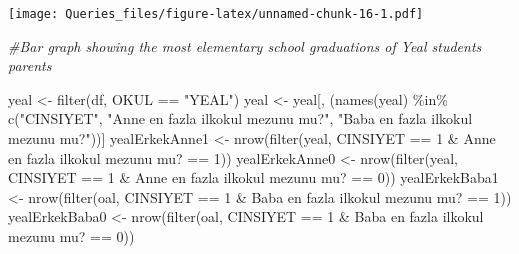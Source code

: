 \documentclass[
]{article}
\newenvironment{Shaded}{\begin{snugshade}}{\end{snugshade}}
\newcommand{\AttributeTok}[1]{\textcolor[rgb]{0.77,0.63,0.00}{#1}}
\newcommand{\CommentTok}[1]{\textcolor[rgb]{0.56,0.35,0.01}{\textit{#1}}}
\newcommand{\DecValTok}[1]{\textcolor[rgb]{0.00,0.00,0.81}{#1}}
\newcommand{\FunctionTok}[1]{\textcolor[rgb]{0.00,0.00,0.00}{#1}}
\newcommand{\NormalTok}[1]{#1}
\newcommand{\OtherTok}[1]{\textcolor[rgb]{0.56,0.35,0.01}{#1}}
\newcommand{\SpecialCharTok}[1]{\textcolor[rgb]{0.00,0.00,0.00}{#1}}
\newcommand{\StringTok}[1]{\textcolor[rgb]{0.31,0.60,0.02}{#1}}
\begin{document}
\texttt{[image: Queries\_files/figure-latex/unnamed-chunk-16-1.pdf]}

\begin{Shaded}
\begin{Highlighting}[]
\CommentTok{\#Bar graph showing the most elementary school graduations of Yeal students\textquotesingle{} parents}

\NormalTok{yeal }\OtherTok{\textless{}{-}} \FunctionTok{filter}\NormalTok{(df, OKUL }\SpecialCharTok{==} \StringTok{"YEAL"}\NormalTok{)}
\NormalTok{yeal }\OtherTok{\textless{}{-}}\NormalTok{ yeal[, (}\FunctionTok{names}\NormalTok{(yeal) }\SpecialCharTok{\%in\%} \FunctionTok{c}\NormalTok{(}\StringTok{"CINSIYET"}\NormalTok{, }\StringTok{"Anne en fazla ilkokul mezunu mu?"}\NormalTok{, }\StringTok{"Baba en fazla ilkokul mezunu mu?"}\NormalTok{))]}
\NormalTok{yealErkekAnne1 }\OtherTok{\textless{}{-}} \FunctionTok{nrow}\NormalTok{(}\FunctionTok{filter}\NormalTok{(yeal, CINSIYET }\SpecialCharTok{==} \DecValTok{1} \SpecialCharTok{\&} \StringTok{\textasciigrave{}}\AttributeTok{Anne en fazla ilkokul mezunu mu?}\StringTok{\textasciigrave{}} \SpecialCharTok{==} \DecValTok{1}\NormalTok{))}
\NormalTok{yealErkekAnne0 }\OtherTok{\textless{}{-}} \FunctionTok{nrow}\NormalTok{(}\FunctionTok{filter}\NormalTok{(yeal, CINSIYET }\SpecialCharTok{==} \DecValTok{1} \SpecialCharTok{\&} \StringTok{\textasciigrave{}}\AttributeTok{Anne en fazla ilkokul mezunu mu?}\StringTok{\textasciigrave{}} \SpecialCharTok{==} \DecValTok{0}\NormalTok{))}
\NormalTok{yealErkekBaba1 }\OtherTok{\textless{}{-}} \FunctionTok{nrow}\NormalTok{(}\FunctionTok{filter}\NormalTok{(oal, CINSIYET }\SpecialCharTok{==} \DecValTok{1} \SpecialCharTok{\&} \StringTok{\textasciigrave{}}\AttributeTok{Baba en fazla ilkokul mezunu mu?}\StringTok{\textasciigrave{}} \SpecialCharTok{==} \DecValTok{1}\NormalTok{))}
\NormalTok{yealErkekBaba0 }\OtherTok{\textless{}{-}} \FunctionTok{nrow}\NormalTok{(}\FunctionTok{filter}\NormalTok{(oal, CINSIYET }\SpecialCharTok{==} \DecValTok{1} \SpecialCharTok{\&} \StringTok{\textasciigrave{}}\AttributeTok{Baba en fazla ilkokul mezunu mu?}\StringTok{\textasciigrave{}} \SpecialCharTok{==} \DecValTok{0}\NormalTok{))}


\end{Highlighting}
\end{Shaded}
\end{document}
